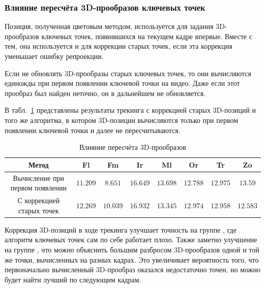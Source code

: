 
\subsubsection{Влияние пересчёта 3D-прообразов ключевых точек}

Позиция, полученная цветовым методом, используется для задания 3D-прообразов
ключевых точек, появившихся на текущем кадре впервые.
Вместе с тем, она используется и для коррекции старых точек, если эта коррекция
уменьшает ошибку репроекции.

Если не обновлять 3D-прообразы старых ключевых точек, то они вычисляются
единожды при первом появлении ключевой точки на видео.
Даже если этот прообраз был найден неточно, он в дальнейшем не обновляется.

В табл.~\ref{tab:reprojection} представлены результаты трекинга с коррекцией
старых 3D-позиций и того же алгоритма, в котором 3D-позиции вычисляются
только при первом появлении ключевой точки и далее не пересчитываются.

\begin{table}[h]
\caption{\label{tab:reprojection}Влияние пересчёта 3D-прообразов}
\begin{center}
\begin{tabular}{|c|c|c|c|c|c|c|c|}
\hline
Метод & Fl & Fm & Ir & Ml & Or & Tr & Zo \\
\hline
Вычисление при первом появлении & $11.209$ & $8.651$ & $16.649$ &
$\mathbf{13.698}$ & $12.788$ & $\mathbf{12.975}$ &
$\mathbf{13.59}$ \\
\hline
С коррекцией старых точек & $\mathbf{12.269}$ & $\mathbf{10.039}$ &
$\mathbf{16.932}$ & $13.345$ &
$\mathbf{12.974}$ &
$12.958$ & $12.583$ \\
\hline
\end{tabular}
\end{center}
\end{table}

Коррекция 3D-позиций в ходе трекинга улучшает точность на группе , где алгоритм ключевых точек сам по себе работает плохо.
Также заметно улучшение на группе , что можно объяснить
большим разбросом 3D-прообразов одной и той же точки, вычисленных на разных
кадрах.
Это увеличивает вероятность того, что первоначально вычисленный 3D-прообраз
оказался недостаточно точен, но можно будет найти лучший по следующим кадрам.

